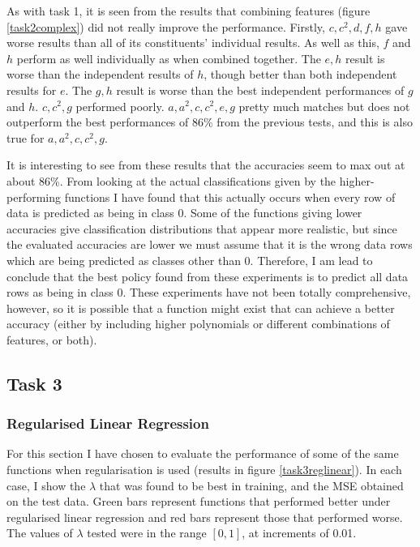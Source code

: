 \documentclass[a4paper,11pt]{article}
\begin{document}
As with task 1, it is seen from the results that combining features (figure \ref{task2complex}) did not really improve the performance.  Firstly, $c,c^2,d,f,h$ gave worse results than all of its constituents' individual results.  As well as this, $f$ and $h$ perform as well individually as when combined together.  The $e,h$ result is worse than the independent results of $h$, though better than both independent results for $e$.  The $g,h$ result is worse than the best independent performances of $g$ and $h$.  $c,c^2,g$ performed poorly.  $a,a^2,c,c^2,e,g$ pretty much matches but does not outperform the best performances of 86\%{} from the previous tests, and this is also true for $a,a^2,c,c^2,g$.

It is interesting to see from these results that the accuracies seem to max out at about 86\%.  From looking at the actual classifications given by the higher-performing functions I have found that this actually occurs when every row of data is predicted as being in class 0.  Some of the functions giving lower accuracies give classification distributions that appear more realistic, but since the evaluated accuracies are lower we must assume that it is the wrong data rows which are being predicted as classes other than 0.  Therefore, I am lead to conclude that the best policy found from these experiments is to predict all data rows as being in class 0.  These experiments have not been totally comprehensive, however, so it is possible that a function might exist that can achieve a better accuracy (either by including higher polynomials or different combinations of features, or both).

\subsection{Task 3}

\subsubsection{Regularised Linear Regression}

For this section I have chosen to evaluate the performance of some of the same functions when regularisation is used (results in figure \ref{task3reglinear}).  In each case, I show the $\lambda$ that was found to be best in training, and the MSE obtained on the test data.  Green bars represent functions that performed better under regularised linear regression and red bars represent those that performed worse.  The values of $\lambda$ tested were in the range $[0,1]$, at increments of 0.01.
\end{document}
